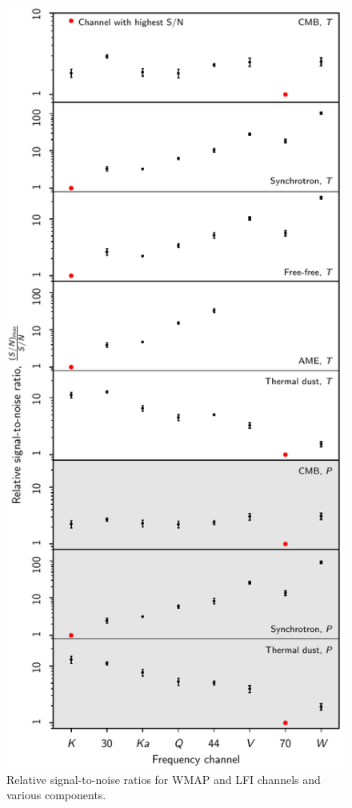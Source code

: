 \documentclass[twocolumn]{../../common/aa}
\begin{document}
\begin{figure}
  \center	
  \includegraphics[width=\linewidth]{figures/fg_s2n_v1.pdf}
  \caption{Relative signal-to-noise ratios for WMAP and LFI channels and various components. }
  \label{fig:fg_s2n}
\end{figure}
\end{document}
